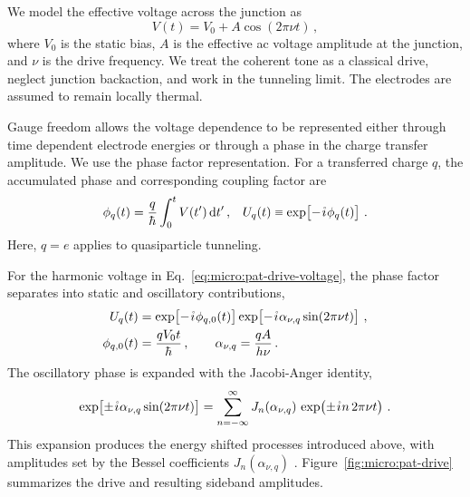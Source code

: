         We model the effective voltage across the junction as
        \begin{equation}
            V(t) = V_0 + A\cos(2\pi\nu t)\,,
            \label{eq:micro:pat-drive-voltage}
        \end{equation}
        where $V_0$ is the static bias, $A$ is the effective ac voltage amplitude at the junction, and $\nu$ is the drive frequency. We treat the coherent tone as a classical drive, neglect junction backaction, and work in the tunneling limit. The electrodes are assumed to remain locally thermal.

        Gauge freedom allows the voltage dependence to be represented either through time dependent electrode energies or through a phase in the charge transfer amplitude. We use the phase factor representation. For a transferred charge $q$, the accumulated phase and corresponding coupling factor are
        \begin{align}
            \phi_q(t)
            = \frac{q}{\hbar}\int_0^t V(t')\,\mathrm{d}t'\,, &&
            U_q(t)
            \sequiv \exp\!\left[-\ima\phi_q(t)\right]\,.
            \label{eq:micro:pat-phase}
        \end{align}
        Here, $q=e$ applies to quasiparticle tunneling.

        For the harmonic voltage in Eq.~\eqref{eq:micro:pat-drive-voltage}, the phase factor separates into static and oscillatory contributions,
        \begin{align}
            U_q(t)
            &= \exp\!\left[-\ima\phi_{q,0}(t)\right]
            \exp\!\left[-\ima\alpha_{\nu, q}\sin(2\pi\nu t)\right]\,,\\
            \phi_{q,0}(t)
            &= \frac{qV_0t}{\hbar}\,,
            \qquad
            \alpha_{\nu, q} = \frac{qA}{h\nu}\,.
        \end{align}
        The oscillatory phase is expanded with the Jacobi-Anger identity,
        \begin{equation}
            \exp\!\left[\pm\ima\alpha_{\nu, q}\sin(2\pi\nu t)\right]
            = \sum_{n=-\infty}^{\infty}
            J_n(\alpha_{\nu, q})\,
            \exp\!\left(\pm\ima n\,2\pi\nu t\right)\,.
            \label{eq:micro:pat-jacobi-anger}
        \end{equation}
        This expansion produces the energy shifted processes introduced above, with amplitudes set by the Bessel coefficients $J_n(\alpha_{\nu, q})$ \cite{nist_dlmf_2025}. Figure~\ref{fig:micro:pat-drive} summarizes the drive and resulting sideband amplitudes.

